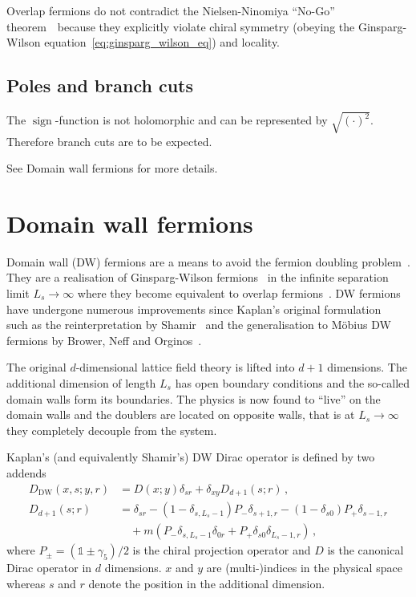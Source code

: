 \documentclass[a4paper]{article}
\DeclareMathOperator{\sign}{sign}
\newcommand{\nnt}{Nielsen-Ninomiya ``No-Go'' theorem~\cite{NIELSEN1981219}}
\begin{document}
	Overlap fermions do not contradict the \nnt\ because they explicitly violate chiral symmetry (obeying the Ginsparg-Wilson equation~\eqref{eq:ginsparg_wilson_eq}) and locality.
	
	\subsection{Poles and branch cuts}
	The $\sign$-function is not holomorphic and can be represented by $\sqrt{(\cdot)^2}$. Therefore branch cuts are to be expected.
	
	See Domain wall fermions for more details.
	
	\section{Domain wall fermions}
	Domain wall (DW) fermions are a means to avoid the fermion doubling problem~\cite{domain_walls_1992,Gattringer:2010zz,JANSEN19961,JANSEN2002191,Intro_chiral_sym}. They are a realisation of Ginsparg-Wilson fermions~\cite{Ginsparg_Wilson} in the infinite separation limit \mbox{$L_s\rightarrow\infty$} where they become equivalent to overlap fermions~\cite{Neuberger_DW_overlap}. DW fermions have undergone numerous improvements since Kaplan's original formulation~\cite{domain_walls_1992} such as the reinterpretation by Shamir~\cite{SHAMIR199390} and the generalisation to Möbius DW fermions by Brower, Neff and Orginos~\cite{BROWER2006191}.
	
	The original $d$-dimensional lattice field theory is lifted into $d+1$ dimensions. The additional dimension of length $L_s$ has open boundary conditions and the so-called domain walls form its boundaries. The physics is now found to ``live'' on the domain walls and the doublers are located on opposite walls, that is at $L_s\rightarrow\infty$ they completely decouple from the system.
	
	Kaplan's (and equivalently Shamir's) DW Dirac operator is defined by two addends
	\begin{align}
		D_\text{DW}(x,s;y,r) &= D(x;y)\delta_{sr} + \delta_{xy}D_{d+1}(s;r)\,,\\
		D_{d+1}(s;r) &= \delta_{sr} - (1-\delta_{s,L_s-1})P_-\delta_{s+1,r} - (1-\delta_{s0})P_+\delta_{s-1,r}\nonumber\\
		&\quad + m\left(P_-\delta_{s,L_s-1}\delta_{0r} + P_+\delta_{s0}\delta_{L_s-1,r}\right)\,,
	\end{align}
	where $P_\pm=(\mathds1\pm\gamma_5)/2$ is the chiral projection operator and $D$ is the canonical Dirac operator in $d$ dimensions. $x$ and $y$ are (multi-)indices in the physical space whereas $s$ and $r$ denote the position in the additional dimension.
	
\end{document}
